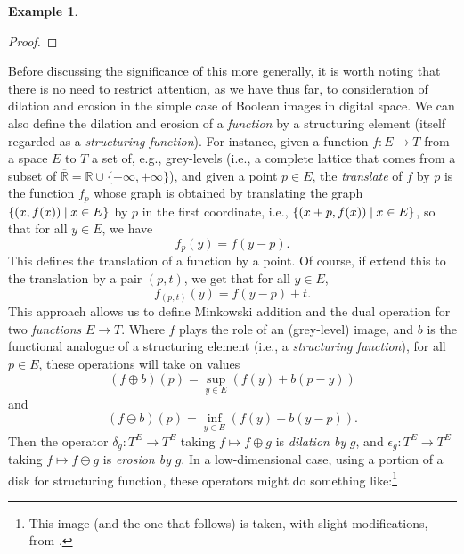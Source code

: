 \documentclass[11pt]{book}
\theoremstyle{definition}
\newtheorem{example}{Example}[section]
\theoremstyle{definition}
\theoremstyle{definition}
\theoremstyle{theorem}
\theoremstyle{definition}
\begin{document}
\begin{example}
\begin{proof}
	\end{proof}
	Before discussing the significance of this more generally, it is worth noting that there is no need to restrict attention, as we have thus far, to consideration of dilation and erosion in the simple case of Boolean images in digital space. We can also define the dilation and erosion of a \textit{function} by a structuring element (itself regarded as a \textit{structuring function}). For instance, given a function $f: E \rightarrow T$ from a space $E$ to $T$ a set of, e.g., grey-levels (i.e., a complete lattice that comes from a subset of $\overline{\mathbb{R}} = \mathbb{R} \cup \{-\infty, +\infty\}$), and given a point $p \in E$, the \textit{translate} of $f$ by $p$ is the function $f_p$ whose graph is obtained by translating the graph $\{(x, f(x)) \hspace*{0.25em}| \hspace*{0.25em} x \in E\}$ by $p$ in the first coordinate, i.e., $\{(x+p, f(x)) \hspace*{0.25em}| \hspace*{0.25em} x \in E\}$, so that for all $y \in E$, we have 
\begin{equation}
f_p(y) = f(y-p). 
\end{equation}
This defines the translation of a function by a point. Of course, if extend this to the translation by a pair $(p, t)$, we get that for all $y \in E$, 
\begin{equation}
f_{(p,t)}(y) = f(y-p) + t.
\end{equation}
This approach allows us to define Minkowski addition and the dual operation for two \textit{functions} $E \rightarrow T$. Where $f$ plays the role of an (grey-level) image, and $b$ is the functional analogue of a structuring element (i.e., a \textit{structuring function}), for all $p \in E$, these operations will take on values 
\begin{equation}
(f \oplus b)(p)  = \sup_{y \in E} (f(y) + b(p-y)) 
\end{equation}
and 
\begin{equation}
(f \ominus b)(p) = \inf_{y \in E} (f(y) - b(y-p)).
\end{equation}
Then the operator $\delta_g: T^E \rightarrow T^E$ taking $f \mapsto f \oplus g$ is \textit{dilation by}  $g$, and $\epsilon_g: T^E \rightarrow T^E$ taking $f \mapsto f \ominus g$ is \textit{erosion by}  $g$. In a low-dimensional case, using a portion of a disk for structuring function, these operators might do something like:\footnote{This image (and the one that follows) is taken, with slight modifications, from \cite{hlavac_grayscale_nodate}.} 

\end{example}
\end{document}
